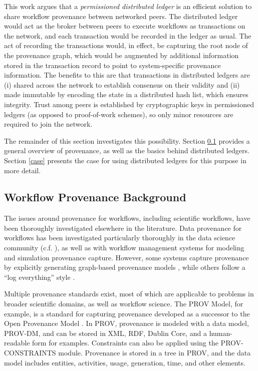 This work argues that a \textit{permissioned distributed ledger} is an efficient
solution to share workflow provenance between networked peers. The distributed
ledger would act as the broker between peers to execute workflows as
transactions on the network, and each transaction would be recorded in the
ledger as usual. The act of recording the transactions would, in effect, be
capturing the root node of the provenance graph, which would be augmented by
additional information stored in the transaction record to point to
system-specific provenance information. The benefits to this are that
transactions in distributed ledgers are (i) shared across the network to
establish consensus on their validity and (ii) made immutable by encoding the
state in a distributed hash list, which ensures integrity. Trust among peers is
established by cryptographic keys in permissioned ledgers (as opposed to
proof-of-work schemes), so only minor resources are required to join the
network.

The remainder of this section investigates this possibility. Section
\ref{provenance-background} provides a general overview of provenance, as well
as the basics behind distributed ledgers. Section \ref{case} presents the case for using
distributed ledgers for this purpose in more detail.

\subsection{Workflow Provenance Background}
\label{provenance-background}

The issues around provenance for workflows, including scientific workflows, have
been thoroughly investigated elsewhere in the literature. Data provenance for
workflows has been investigated particularly thoroughly in the data science
community (c.f. \cite{davidson_provenance_2007}), as well as with workflow
management systems for modeling and simulation provenance capture. However,
some systems capture provenance by explicitly generating graph-based
provenance models \cite{pizzi_aiida:_2016}, while others follow a ``log
everything'' style \cite{billings_eclipse_2018}.

Multiple provenance standards exist, most of which are applicable to problems in
broader scientific domains, as well as workflow science. The PROV Model, for
example, is a standard for capturing provenance developed as a successor to the
Open Provenance Model \cite{noauthor_prov-overview_nodate}
\cite{moreau_open_2011}. In PROV, provenance is modeled with a data model,
PROV-DM, and can be stored in XML, RDF, Dublin Core, and a human-readable form
for examples. Constraints can also be applied using the PROV-CONSTRAINTS module.
Provenance is stored in a tree in PROV, and the data model includes entities,
activities, usage, generation, time, and other elements.

